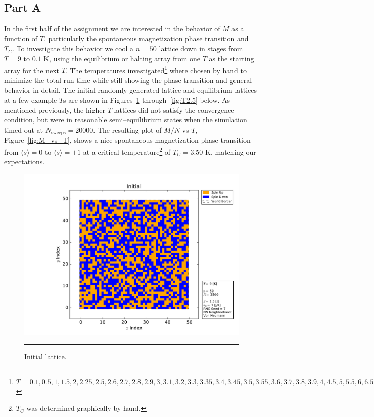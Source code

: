 \documentclass[notitlepage,aps,prd,nofootinbib]{revtex4-1}
\begin{document}
\subsection{Part A}
\label{subsec:results_part_a}
In the first half of the assignment we are interested in the behavior of $M$ as a function of $T$, particularly the spontaneous magnetization phase transition and $T_{C}$. To investigate this behavior we cool a $n=50$ lattice down in stages from $T=9$ to $0.1$ K, using the equilibrium or halting array from one $T$ as the starting array for the next $T$. The temperatures investigated\footnote{$T = 0.1, 0.5, 1, 1.5, 2, 2.25, 2.5, 2.6, 2.7, 2.8, 2.9, 3, 3.1, 3.2, 3.3, 3.35, 3.4, 3.45, 3.5, 3.55, 3.6, 3.7, 3.8, 3.9, 4, 4.5, 5, 5.5, 6, 6.5, 7, 8, 9$} where chosen by hand to minimize the total run time while still showing the phase transition and general behavior in detail. The initial randomly generated lattice and equilibrium lattices at a few example $T$s are shown in Figures~\ref{fig:initial} through~\ref{fig:T2.5} below. As mentioned previously, the higher $T$ lattices did not satisfy the convergence condition, but were in reasonable semi--equilibrium states when the simulation timed out at $N_{\mathrm{sweeps}} = 20000$. The resulting plot of $M/N$ vs $T$, Figure~\ref{fig:M_vs_T}, shows a nice spontaneous magnetization phase transition from $\langle s \rangle = 0$ to $\langle s \rangle = +1$ at a critical temperature\footnote{$T_{C}$ was determined graphically by hand.} of $T_{C} = 3.50$ K, matching our expectations.

\begin{figure}[!htbc]
  \centering
  \includegraphics[width=.82\textwidth]{../output/plots_for_paper_von_neumann/part_a/initial.pdf}
	{\par\nobreak\rule[9pt]{35em}{0.5pt}\vspace{-5mm}}
	\caption{Initial lattice.}
	\label{fig:initial}
\end{figure}
\end{document}
